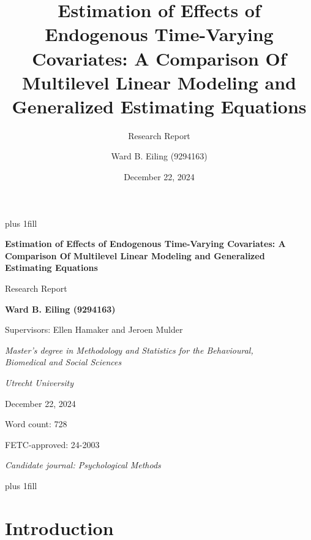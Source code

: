 \documentclass[
  12pt,
  a4paper,
]{article}
\title{Estimation of Effects of Endogenous Time-Varying Covariates: A
Comparison Of Multilevel Linear Modeling and Generalized Estimating
Equations}
\subtitle{Research Report}
\author{Ward B. Eiling (9294163)}
\date{December 22, 2024}
\begin{document}
\cleardoublepage
\thispagestyle{empty}
{\centering
\hbox{}\vskip 0cm plus 1fill
{\Large\bfseries Estimation of Effects of Endogenous Time-Varying
Covariates: A Comparison Of Multilevel Linear Modeling and Generalized
Estimating Equations \par}
\vspace{3ex}
{\large Research Report \par}
\vspace{9ex}
{\large\bfseries Ward B. Eiling (9294163) \par}
\vspace{3ex}
{\large Supervisors: Ellen Hamaker and Jeroen Mulder \par}
\vspace{9ex}
{\normalsize \textit{Master's degree in Methodology and Statistics for the Behavioural, \\ Biomedical and Social Sciences} \par}
\vspace{3ex}
{\normalsize \textit{Utrecht University} \par}
\vspace{9ex}
{\normalsize December 22, 2024 \par}
\vspace{3ex}
{\normalsize Word count: 728 \par}
\vspace{9ex}
{\normalsize FETC-approved: 24-2003 \par}
\vspace{9ex}
{\normalsize \textit{Candidate journal: Psychological Methods} \par}
\hbox{}\vskip 0cm plus 1fill
}


\newpage

\section{Introduction}\label{introduction}
\end{document}
